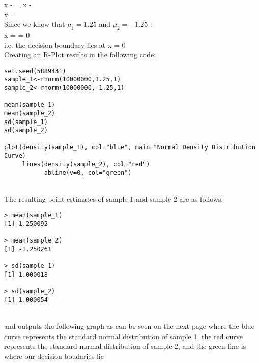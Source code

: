 \documentclass[12pt]{article}
\begin{document}
\hspace{2.4cm} \Rightarrow  x - = x - \\

\hspace{2.4cm} \Rightarrow  x = \\

Since we know that $\mu_{1} = 1.25$ and $\mu_{2} = -1.25$ :\\

\hspace{2.4cm} \Rightarrow x =  = 0\\

i.e. the decision boundary lies at x = 0\\

Creating an R-Plot results in the following code: 

\begin{verbatim}
set.seed(5889431)
sample_1<-rnorm(10000000,1.25,1)
sample_2<-rnorm(10000000,-1.25,1)

mean(sample_1)   
mean(sample_2)
sd(sample_1)
sd(sample_2)

plot(density(sample_1), col="blue", main="Normal Density Distribution Curve)
     lines(density(sample_2), col="red")
           abline(v=0, col="green")
\end{verbatim}\\

\newpage
The resulting point estimates of sample 1 and sample 2 are as follows:\\


\begin{verbatim}
> mean(sample_1)   
[1] 1.250092

> mean(sample_2)
[1] -1.250261

> sd(sample_1)
[1] 1.000018

> sd(sample_2)
[1] 1.000054
\end{verbatim}
\\
and outputs the following graph as can be seen on the next page  where the blue curve represents the standard normal distribution of sample 1, the red curve represents the standard normal distribution of sample 2, and the green line is where our decision boudaries lie 
\end{document}
